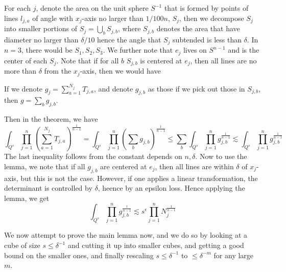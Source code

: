 For each $j$, denote the area on the unit sphere $S^{-1}$ that is formed by points of lines $l_{j,a}$ of angle with $x_j$-axis no larger than $1/100n$, $S_j$, then we decompose $S_j$ into smaller portions of $S_j=\bigcup_b S_{j,b}$, where $S_{j,b}$ denotes the area that have diameter no larger than $\delta/10$ hence the angle that $S_j$ subtended is less than $\delta$. In $n=3$, there would be $S_1, S_2, S_3$. We further note that $e_j$ lives on $S^{n-1}$ and is the center of each $S_j$. Note that if for all $b$ $S_{j,b}$ is centered at $e_j$, then all lines are no more than $\delta$ from the $x_j$-axis, then we would have

If we denote $g_j=\sum_{a=1}^{N_j}T_{j,a}$, and denote $g_{j,b}$ as those if we pick out those in $S_{j,b}$, then $g=\sum_{b}g_{j,b}$.

Then in the theorem, we have
\begin{equation*}
    \int_{Q^s}\prod_{j=1}^n\left(\sum_{a=1}^{N_j}T_{j,a}\right)^{\frac{1}{n-1}}=\int_{Q^s}\prod_{j=1}^n\left(\sum_bg_{j,b}\right)^{\frac{1}{n-1}}\leq\sum_b\int_{Q^s}\prod_{j=1}^n g_{j,b}^{\frac{1}{n-1}}\lesssim \int_{Q^s}\prod_{j=1}^ng_{j,b}^{\frac{1}{n-1}}
\end{equation*}
The last inequality follows from the constant depends on $n, \delta$. Now to use the lemma, we note that if all $g_{j,b}$ are centered at $e_j$, then all lines are within $\delta$ of $x_j$-axis, but this is not the case. However, if one applies a linear transformation, the determinant is controlled by $\delta$, heence by an epsilon loss. Hence applying the lemma, we get
\begin{equation*}
    \int_{Q^s}\prod_{j=1}^ng_{j,b}^{\frac{1}{n-1}}\lesssim s^\epsilon\prod_{j=1}^nN_j^{\frac{1}{n-1}}
\end{equation*}

We now attempt to prove the main lemma now, and we do so by looking at a cube of size $s\leq\delta^{-1}$ and cutting it up into smaller cubes, and getting a good bound on the smaller ones, and finally rescaling $s\leq\delta^{-1}$ to $\leq\delta^{-m}$ for any large $m$. 

